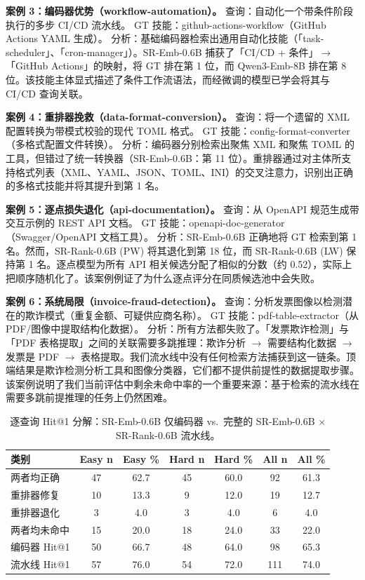 \documentclass[11pt,UTF8,fontset=fandol]{ctexart}
\makeatletter
\newcommand{\Hit}{Hit@1}
\makeatother
\begin{document}
\textbf{案例 3：编码器优势（workflow-automation）。} 查询：自动化一个带条件阶段执行的多步 CI/CD 流水线。
GT 技能：github-actions-workflow（GitHub Actions YAML 生成）。
分析：基础编码器检索出通用自动化技能（「task-scheduler」、「cron-manager」）。SR-Emb-0.6B 捕获了「CI/CD + 条件」$\rightarrow$「GitHub Actions」的映射，将 GT 排在第 1 位，而 Qwen3-Emb-8B 排在第 8 位。该技能主体显式描述了条件工作流语法，而经微调的模型已学会将其与 CI/CD 查询关联。

\textbf{案例 4：重排器挽救（data-format-conversion）。} 查询：将一个遗留的 XML 配置转换为带模式校验的现代 TOML 格式。
GT 技能：config-format-converter（多格式配置文件转换）。
分析：编码器分别检索出聚焦 XML 和聚焦 TOML 的工具，但错过了统一转换器（SR-Emb-0.6B：第 11 位）。重排器通过对主体所支持格式列表（XML、YAML、JSON、TOML、INI）的交叉注意力，识别出正确的多格式技能并将其提升到第 1 名。

\textbf{案例 5：逐点损失退化（api-documentation）。} 查询：从 OpenAPI 规范生成带交互示例的 REST API 文档。
GT 技能：openapi-doc-generator（Swagger/OpenAPI 文档工具）。
分析：SR-Emb-0.6B 正确地将 GT 检索到第 1 名。然而，SR-Rank-0.6B (PW) 将其退化到第 18 位，而 SR-Rank-0.6B (LW) 保持第 1 名。逐点模型为所有 API 相关候选分配了相似的分数（约 0.52），实际上把顺序随机化了。该案例例证了为什么逐点评分在同质候选池中会失败。

\textbf{案例 6：系统局限（invoice-fraud-detection）。} 查询：分析发票图像以检测潜在的欺诈模式（重复金额、可疑供应商名称）。
GT 技能：pdf-table-extractor（从 PDF/图像中提取结构化数据）。
分析：所有方法都失败了。「发票欺诈检测」与「PDF 表格提取」之间的关联需要多跳推理：欺诈分析 $\rightarrow$ 需要结构化数据 $\rightarrow$ 发票是 PDF $\rightarrow$ 表格提取。我们流水线中没有任何检索方法捕获到这一链条。顶端结果是欺诈检测分析工具和图像分类器，它们都不提供前提性的数据提取步骤。该案例说明了我们当前评估中剩余未命中率的一个重要来源：基于检索的流水线在需要多跳前提推理的任务上仍然困难。

\begin{table}[H]\centering
\caption{逐查询 \Hit{} 分解：SR-Emb-0.6B 仅编码器 vs.\ 完整的 SR-Emb-0.6B $\times$ SR-Rank-0.6B 流水线。}
\begin{tabular}{lcccccc}
\toprule
类别 & Easy n & Easy \% & Hard n & Hard \% & All n & All \% \\ \midrule
两者均正确 & 47 & 62.7 & 45 & 60.0 & 92 & 61.3 \\
重排器修复 & 10 & 13.3 & 9 & 12.0 & 19 & 12.7 \\
重排器退化 & 3 & 4.0 & 3 & 4.0 & 6 & 4.0 \\
两者均未命中 & 15 & 20.0 & 18 & 24.0 & 33 & 22.0 \\
编码器 \Hit{} & 50 & 66.7 & 48 & 64.0 & 98 & 65.3 \\
流水线 \Hit{} & 57 & 76.0 & 54 & 72.0 & 111 & 74.0 \\
\bottomrule
\end{tabular}
\label{tab:24}
\end{table}
\end{document}
